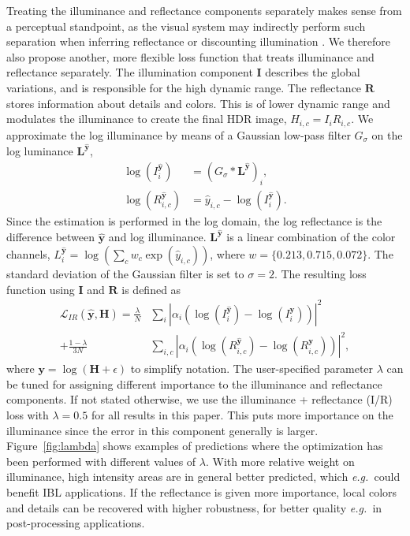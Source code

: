 \documentclass[acmtog]{acmart}
\newcommand{\figref}[1]{Figure~\ref{fig:#1}}
\newcommand{\vect}[1]{\boldsymbol{#1}}
\newcommand{\loss}{\mathcal{L}}
\newcommand{\eg}{\emph{e.g.\ }}
\newcommand{\hdrp}{H}
\newcommand{\yp}{\hat{y}}
\newcommand{\illp}{I}
\newcommand{\reflp}{R}
\newcommand{\hdr}{\vect{\hdrp}}
\newcommand{\y}{\vect{\yp}}
\newcommand{\ill}{\vect{\illp}}
\newcommand{\refl}{\vect{\reflp}}
\newcommand{\msk}{\alpha}
\begin{document}
Treating the illuminance and reflectance components separately makes sense from a perceptual standpoint, as the visual system may indirectly perform such separation when inferring reflectance or discounting illumination \cite{Gilchrist1984}. 
We therefore also propose another, more flexible loss function that treats illuminance and reflectance separately.
The illumination component $\ill$ describes the global variations, and is responsible for the high dynamic range. The reflectance $\refl$ stores information about details and colors. This is of lower dynamic range and modulates the illuminance to create the final HDR image, $\hdrp_{i,c} = \illp_i \reflp_{i,c}$. We approximate the log illuminance by means of a Gaussian low-pass filter $G_\sigma$ on the log luminance $\vect{L}^{\y}$,
\begin{equation}
\begin{split}
\log\left( \illp_i^{\y} \right) &= \left( G_\sigma \ast \vect{L}^{\y} \right)_i, \\
\log\left( \reflp^{\y}_{i,c} \right) &= \yp_{i,c} - \log\left( \illp_i^{\y} \right).
\end{split}
\end{equation}
Since the estimation is performed in the log domain, the log reflectance is the difference between $\y$ and log illuminance.
$\vect{L}^{\y}$ is a linear combination of the color channels, $L^{\y}_i = \log(\sum_c w_c \exp(\yp_{i,c}))$, where $w = \{0.213, 0.715, 0.072\}$. The standard deviation of the Gaussian filter is set to $\sigma = 2$. The resulting loss function using $\ill$ and $\refl$ is defined as
\begin{equation}
\begin{split}
\loss_{IR}(\y,\hdr) = \frac{\lambda}{N} & \sum_i \left| \msk_i \left(\log \left(\illp_i^{\y}\right) - \log \left(\illp_i^{\vect{y}}\right) \right) \right|^2 \\
+ \frac{1-\lambda}{3N} &\sum_{i,c} \left| \msk_i \left(\log \left(\reflp_{i,c}^{\y}\right) - \log \left(\reflp_{i,c}^{\vect{y}}\right) \right) \right|^2,
\end{split}
\label{eqn:ir_loss}
\end{equation}
where $\vect{y} = \log (\hdr + \epsilon)$ to simplify notation. The user-specified parameter $\lambda$ can be tuned for assigning different importance to the illuminance and reflectance components. If not stated otherwise, we use the illuminance + reflectance (I/R) loss with $\lambda = 0.5$ for all results in this paper. This puts more importance on the illuminance since the error in this component generally is larger. 
\figref{lambda} shows examples of predictions where the optimization has been performed with different values of $\lambda$. With more relative weight on illuminance, high intensity areas are in general better predicted, which \eg could benefit IBL applications. If the reflectance is given more importance, local colors and details can be recovered with higher robustness, for better quality \eg in post-processing applications.
\end{document}
